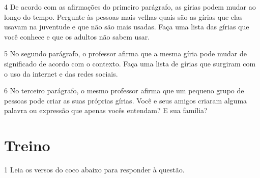 \num{4} De acordo com as afirmações do primeiro parágrafo, as gírias podem
mudar ao longo do tempo. Pergunte às pessoas mais velhas quais são as 
gírias que elas usavam na juventude e que não são mais usadas. Faça uma
lista das gírias que você conhece e que os adultos não sabem usar. 


\num{5} No segundo parágrafo, o professor afirma que a mesma gíria pode
mudar de significado de acordo com o contexto. Faça uma lista de gírias
que surgiram com o uso da internet e das redes sociais.


\num{6} No terceiro parágrafo, o mesmo professor afirma que um pequeno
grupo de pessoas pode criar as suas próprias gírias. Você e seus amigos 
criaram alguma palavra ou expressão que apenas vocês entendam? E sua 
família? 


\section*{Treino}

\num{1} Leia os versos do coco abaixo para responder à questão.

